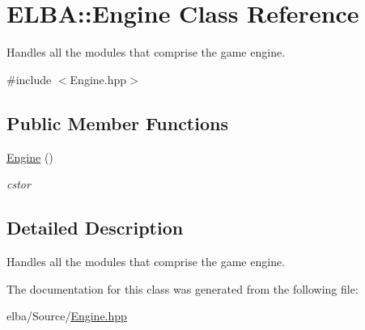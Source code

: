 \hypertarget{class_e_l_b_a_1_1_engine}{}\section{E\+L\+BA\+:\+:Engine Class Reference}
\label{class_e_l_b_a_1_1_engine}


Handles all the modules that comprise the game engine.  




{\ttfamily \#include $<$Engine.\+hpp$>$}

\subsection*{Public Member Functions}
\begin{DoxyCompactItemize}
\item 
\mbox{\label{class_e_l_b_a_1_1_engine_a9f205a0bef747c264ac44d9185ffdbf8}} 
\mbox{\hyperlink{class_e_l_b_a_1_1_engine_a9f205a0bef747c264ac44d9185ffdbf8}{Engine}} ()
\begin{DoxyCompactList}\small\item\em cstor \end{DoxyCompactList}\end{DoxyCompactItemize}


\subsection{Detailed Description}
Handles all the modules that comprise the game engine. 

The documentation for this class was generated from the following file\+:\begin{DoxyCompactItemize}
\item 
elba/\+Source/\mbox{\hyperlink{_engine_8hpp}{Engine.\+hpp}}\end{DoxyCompactItemize}
